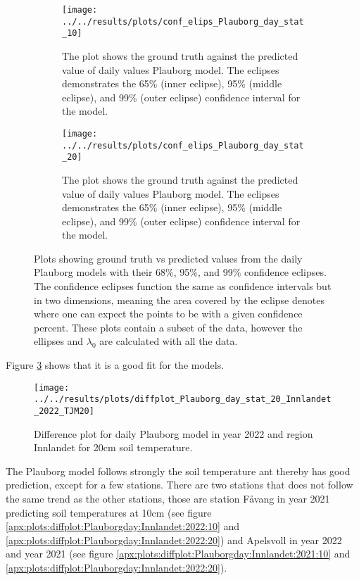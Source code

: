 \begin{figure}
	\begin{subfigure}{0.4\linewidth}
		\centering
		\texttt{[image: ../../results/plots/conf\_elips\_Plauborg\_day\_stat\_10]}
		\caption[Confidence eclipse of daily values Plauborg model 10cm]{The plot shows the ground truth against the predicted value of daily values Plauborg model. The eclipses demonstrates the 65\% (inner eclipse), 95\% (middle eclipse), and 99\% (outer eclipse) confidence interval for the model.}
		\label{fig:confelipsplauborgdaystat10}
	\end{subfigure}
	\hfill
	\begin{subfigure}{0.4\textwidth}
		\centering
		\texttt{[image: ../../results/plots/conf\_elips\_Plauborg\_day\_stat\_20]}
		\caption[Confidence eclipse of daily values Plauborg model 20cm]{The plot shows the ground truth against the predicted value of daily values Plauborg model. The eclipses demonstrates the 65\% (inner eclipse), 95\% (middle eclipse), and 99\% (outer eclipse) confidence interval for the model.}
		\label{fig:confelipsplauborgdaystat20}
	\end{subfigure}
	\caption{Plots showing ground truth vs predicted values from the daily Plauborg models with their 68\%, 95\%, and 99\% confidence eclipses. The confidence eclipses function the same as confidence intervals but in two dimensions, meaning the area covered by the eclipse denotes where one can expect the points to be with a given confidence percent. These plots contain a subset of the data, however the ellipses and $\lambda_0$ are calculated with all the data.}
	\label{fig:plauborg:day:eclipse}
\end{figure}

Figure \ref{fig:plauborg:day:eclipse} shows that it is a good fit for the models.

\begin{figure}
	\centering
	\texttt{[image: ../../results/plots/diffplot\_Plauborg\_day\_stat\_20\_Innlandet\_2022\_TJM20]}
	\caption{Difference plot for daily Plauborg model in year 2022 and region Innlandet for 20cm soil temperature.}
	\label{fig:plauborg:day:special}
\end{figure}

The Plauborg model follows strongly the soil temperature ant thereby has good prediction, except for a few stations. There are two stations that does not follow the same trend as the other stations, those are station Fåvang in year 2021 predicting soil temperatures at 10cm (see figure \ref{apx:plots:diffplot:Plauborgday:Innlandet:2022:10} and \ref{apx:plots:diffplot:Plauborgday:Innlandet:2022:20}) and Apelsvoll in year 2022 and year 2021 (see figure \ref{apx:plots:diffplot:Plauborgday:Innlandet:2021:10} and \ref{apx:plots:diffplot:Plauborgday:Innlandet:2022:20}). 

